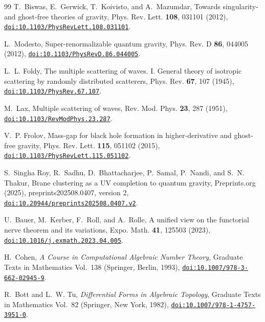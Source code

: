 \documentclass[aps,prd,10pt,twocolumn,superscriptaddress,nofootinbib,floatfix,longbibliography,showpacs,showkeys]{revtex4-2}
\theoremstyle{plain}
\theoremstyle{definition}
\theoremstyle{remark}
\begin{document}
\begin{thebibliography}{99}
T.~Biswas, E.~Gerwick, T.~Koivisto, and A.~Mazumdar, Towards singularity- and ghost-free theories of gravity, Phys. Rev. Lett. \textbf{108}, 031101 (2012), \href{https://doi.org/10.1103/PhysRevLett.108.031101}{\nolinkurl{doi:10.1103/PhysRevLett.108.031101}}.

L.~Modesto, Super-renormalizable quantum gravity, Phys. Rev. D \textbf{86}, 044005 (2012), \href{https://doi.org/10.1103/PhysRevD.86.044005}{\nolinkurl{doi:10.1103/PhysRevD.86.044005}}.

L.~L. Foldy, The multiple scattering of waves. I. General theory of isotropic scattering by randomly distributed scatterers, Phys. Rev. \textbf{67}, 107 (1945), \href{https://doi.org/10.1103/PhysRev.67.107}{\nolinkurl{doi:10.1103/PhysRev.67.107}}.

M.~Lax, Multiple scattering of waves, Rev. Mod. Phys. \textbf{23}, 287 (1951), \href{https://doi.org/10.1103/RevModPhys.23.287}{\nolinkurl{doi:10.1103/RevModPhys.23.287}}.

V.~P. Frolov, Mass-gap for black hole formation in higher-derivative and ghost-free gravity, Phys. Rev. Lett. \textbf{115}, 051102 (2015), \href{https://doi.org/10.1103/PhysRevLett.115.051102}{\nolinkurl{doi:10.1103/PhysRevLett.115.051102}}.

S.~Singha Roy, R.~Sadhu, D.~Bhattacharjee, P.~Samal, P.~Nandi, and S.~N. Thakur, Brane clustering as a UV completion to quantum gravity, Preprints.org (2025), preprints202508.0407, version 2, \href{https://doi.org/10.20944/preprints202508.0407.v2}{\nolinkurl{doi:10.20944/preprints202508.0407.v2}}.

U.~Bauer, M.~Kerber, F.~Roll, and A.~Rolle, A unified view on the functorial nerve theorem and its variations, Expo. Math. \textbf{41}, 125503 (2023), \href{https://doi.org/10.1016/j.exmath.2023.04.005}{\nolinkurl{doi:10.1016/j.exmath.2023.04.005}}.

H.~Cohen, \emph{A Course in Computational Algebraic Number Theory}, Graduate Texts in Mathematics Vol.~138 (Springer, Berlin, 1993), \href{https://doi.org/10.1007/978-3-662-02945-9}{\nolinkurl{doi:10.1007/978-3-662-02945-9}}.

R.~Bott and L.~W. Tu, \emph{Differential Forms in Algebraic Topology}, Graduate Texts in Mathematics Vol.~82 (Springer, New York, 1982), \href{https://doi.org/10.1007/978-1-4757-3951-0}{\nolinkurl{doi:10.1007/978-1-4757-3951-0}}.


\end{thebibliography}
\end{document}
